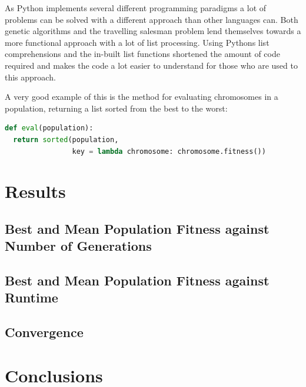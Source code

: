 \documentclass[10pt, a4paper]{article}
\begin{document}
As Python implements several different programming paradigms a lot of problems
can be solved with a different approach than other languages can. Both genetic
algorithms and the travelling salesman problem lend themselves towards a more
functional approach with a lot of list processing. Using Pythons list
comprehensions and the in-built list functions shortened the amount of code 
required and makes the code a lot easier to understand for those who are used 
to this approach.

A very good example of this is the method for evaluating chromosomes in a
population, returning a list sorted from the best to the worst:

\begin{lstlisting}[language=Python, 
                   caption=Using function elements to improve sustinctness and
                           readability]
def eval(population):
  return sorted(population, 
                key = lambda chromosome: chromosome.fitness())
\end{lstlisting}
 
\section{Results}
\label{sec:results}

\subsection{Best and Mean Population Fitness against Number of Generations}

\subsection{Best and Mean Population Fitness against Runtime}

\subsection{Convergence}

\section{Conclusions}




\end{document}
